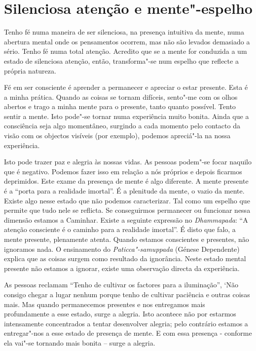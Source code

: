 \chapter{Silenciosa atenção e mente"-espelho}

Tenho fé numa maneira de ser silenciosa, na presença intuitiva da mente, numa
abertura mental onde os pensamentos ocorrem, mas não são levados demasiado a
sério. Tenho fé numa total atenção. Acredito que se a mente for conduzida a um
estado de silenciosa atenção, então, transforma"-se num espelho que reflecte a
própria natureza.

Fé em ser consciente é aprender a permanecer e apreciar o estar
presente. Esta é a minha prática. Quando as coisas se tornam difíceis,
sento"-me com os olhos abertos e trago a minha mente para o presente,
tanto quanto possível. Tento sentir a mente. Isto pode"-se tornar numa
experiência muito bonita. Ainda que a consciência seja algo momentâneo,
surgindo a cada momento pelo contacto da visão com os objectos visíveis
(por exemplo), podemos apreciá"-la na nossa experiência.

Isto pode trazer paz e alegria às nossas vidas. As pessoas podem"-se
focar naquilo que é negativo. Podemos fazer isso em relação a nós
próprios e depois ficarmos deprimidos. Este exame da presença de mente é
algo diferente. A mente presente é a ``porta para a realidade imortal''.
É a plenitude da mente, o vazio da mente. Existe algo nesse estado que
não podemos caracterizar. Tal como um espelho que permite que tudo nele
se reflicta. Se conseguirmos permanecer ou funcionar nessa dimensão
estamos a Caminhar. Existe a seguinte expressão no \emph{Dhammapada}:
``A atenção consciente é o caminho para a realidade imortal''. É disto
que falo, a mente presente, plenamente atenta. Quando estamos
conscientes e presentes, não ignoramos nada. O ensinamento do
\emph{Paticca"-samuppada} (Génese Dependente) explica que as coisas
surgem como resultado da ignorância. Neste estado mental presente não
estamos a ignorar, existe uma observação directa da experiência.

As pessoas reclamam ``Tenho de cultivar os factores para a iluminação'',
`Não consigo chegar a lugar nenhum porque tenho de cultivar paciência e
outras coisas mais. Mas quando permanecemos presentes e nos entregamos
mais profundamente a esse estado, surge a alegria. Isto acontece não por
estarmos intensamente concentrados a tentar desenvolver alegria; pelo
contrário estamos a entregar"-nos a esse estado de presença de mente. E
com essa presença - conforme ela vai"-se tornando mais bonita -- surge a
alegria.

